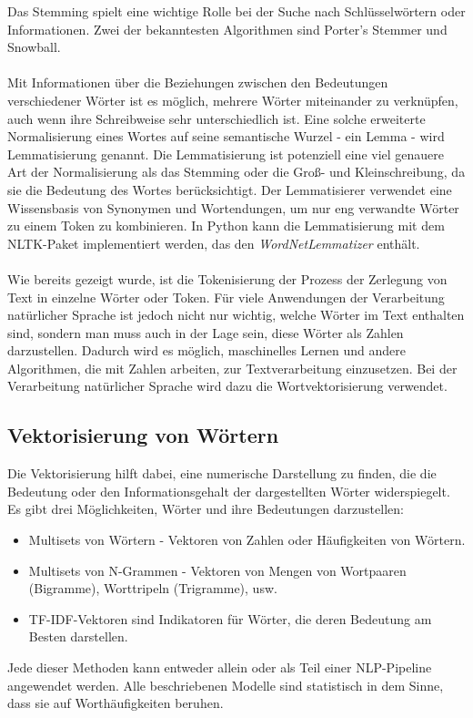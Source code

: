  Das Stemming spielt eine wichtige Rolle bei der Suche nach Schlüsselwörtern oder Informationen. 
Zwei der bekanntesten Algorithmen sind Porter's Stemmer und Snowball.\\\\
Mit Informationen über die Beziehungen zwischen den Bedeutungen verschiedener Wörter ist es möglich, mehrere Wörter miteinander zu verknüpfen, auch wenn ihre Schreibweise sehr unterschiedlich ist. 
Eine solche erweiterte Normalisierung eines Wortes auf seine semantische Wurzel - ein Lemma - wird Lemmatisierung genannt. 
Die Lemmatisierung ist potenziell eine viel genauere Art der Normalisierung als das Stemming oder die Groß- und Kleinschreibung, da sie die Bedeutung des Wortes berücksichtigt. 
Der Lemmatisierer verwendet eine Wissensbasis von Synonymen und Wortendungen, um nur eng verwandte Wörter zu einem Token zu kombinieren. 
In Python kann die Lemmatisierung mit dem \ac{NLTK}-Paket implementiert werden, das den \textit{WordNetLemmatizer} enthält.\\\\
Wie bereits gezeigt wurde, ist die Tokenisierung der Prozess der Zerlegung von Text in einzelne Wörter oder Token. 
Für viele Anwendungen der Verarbeitung natürlicher Sprache ist jedoch nicht nur wichtig, welche Wörter im Text enthalten sind, sondern man muss auch in der Lage sein, diese Wörter als Zahlen darzustellen. 
Dadurch wird es möglich, maschinelles Lernen und andere Algorithmen, die mit Zahlen arbeiten, zur Textverarbeitung einzusetzen. 
Bei der Verarbeitung natürlicher Sprache wird dazu die Wortvektorisierung verwendet.
\subsection{Vektorisierung von Wörtern}
Die Vektorisierung hilft dabei, eine numerische Darstellung zu finden, die die Bedeutung oder den Informationsgehalt der dargestellten Wörter widerspiegelt. 
Es gibt drei Möglichkeiten, Wörter und ihre Bedeutungen darzustellen:
\begin{itemize}
    \item Multisets von Wörtern - Vektoren von Zahlen oder Häufigkeiten von Wörtern. 
    \item Multisets von N-Grammen - Vektoren von Mengen von Wortpaaren (Bigramme), Worttripeln (Trigramme), usw.
    \item \ac{TF}-\ac{IDF}-Vektoren sind Indikatoren für Wörter, die deren Bedeutung am Besten darstellen.
\end{itemize}
Jede dieser Methoden kann entweder allein oder als Teil einer \ac{NLP}-Pipeline angewendet werden. 
Alle beschriebenen Modelle sind statistisch in dem Sinne, dass sie auf Worthäufigkeiten beruhen.

